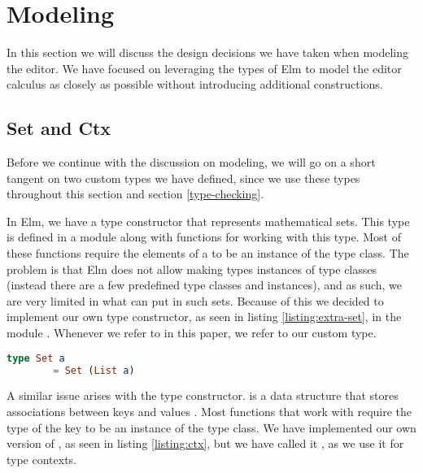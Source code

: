 \section{Modeling}
\label{modeling}

In this section we will discuss the design decisions we have taken when modeling
the editor. We have focused on leveraging the types of Elm to model the editor
calculus as closely as possible without introducing additional constructions.

\subsection{Set and Ctx}

Before we continue with the discussion on modeling, we will go on a short
tangent on two custom types we have defined, since we use these types throughout
this section and section \ref{type-checking}.

In Elm, we have a type constructor  that represents mathematical
sets. This type is defined in a module along with functions for working with
this type. Most of these functions require the elements  of a 
to be an instance of the  type class. The problem is that Elm
does not allow making types instances of type classes (instead there are a few
predefined type classes and instances), and as such, we are very limited in what
can put in such sets. Because of this we decided to implement our own  type constructor, as seen in listing \ref{listing:extra-set}, in the module
. Whenever we refer to  in this paper, we refer to our
custom type.

\begin{lstlisting}[language=elm,%
                   label={listing:extra-set},%
                   gobble=4,%
                   caption={Our own \elm{Set a}.},%
                   ]
    type Set a
        = Set (List a)
\end{lstlisting}

A similar issue arises with the  type constructor. 
is a data structure that stores associations between keys  and values
. Most functions that work with  require the type of the
key to be an instance of the  type class. We have implemented
our own version of , as seen in listing \ref{listing:ctx}, but we
have called it , as we use it for type contexts.

